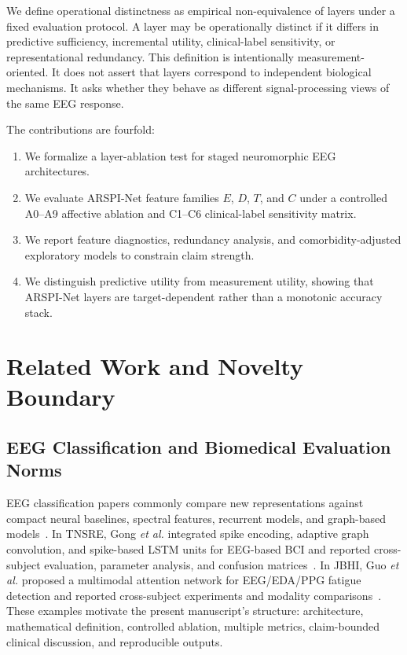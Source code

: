 \documentclass[journal]{IEEEtran}
\begin{document}
We define operational distinctness as empirical non-equivalence of layers under a fixed evaluation protocol. A layer may be operationally distinct if it differs in predictive sufficiency, incremental utility, clinical-label sensitivity, or representational redundancy. This definition is intentionally measurement-oriented. It does not assert that layers correspond to independent biological mechanisms. It asks whether they behave as different signal-processing views of the same EEG response.

The contributions are fourfold:
\begin{enumerate}
    \item We formalize a layer-ablation test for staged neuromorphic EEG architectures.
    \item We evaluate ARSPI-Net feature families $E$, $D$, $T$, and $C$ under a controlled A0--A9 affective ablation and C1--C6 clinical-label sensitivity matrix.
    \item We report feature diagnostics, redundancy analysis, and comorbidity-adjusted exploratory models to constrain claim strength.
    \item We distinguish predictive utility from measurement utility, showing that ARSPI-Net layers are target-dependent rather than a monotonic accuracy stack.
\end{enumerate}

\section{Related Work and Novelty Boundary}
\subsection{EEG Classification and Biomedical Evaluation Norms}
EEG classification papers commonly compare new representations against compact neural baselines, spectral features, recurrent models, and graph-based models~\cite{lawhern2018eegnet,craik2019deep,klepl2024gnn}. In TNSRE, Gong \emph{et al.} integrated spike encoding, adaptive graph convolution, and spike-based LSTM units for EEG-based BCI and reported cross-subject evaluation, parameter analysis, and confusion matrices~\cite{gong2023sglnet}. In JBHI, Guo \emph{et al.} proposed a multimodal attention network for EEG/EDA/PPG fatigue detection and reported cross-subject experiments and modality comparisons~\cite{guo2025mma}. These examples motivate the present manuscript's structure: architecture, mathematical definition, controlled ablation, multiple metrics, claim-bounded clinical discussion, and reproducible outputs.
\end{document}
